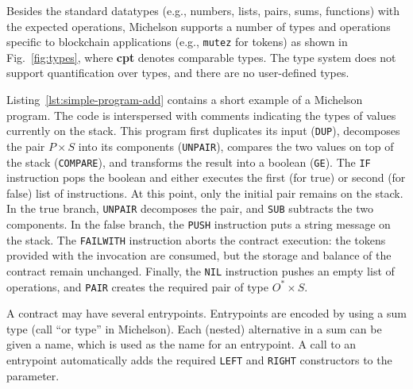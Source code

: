 \documentclass[runningheads]{llncs}
\begin{document}
Besides the standard datatypes (e.g., numbers, lists, pairs, sums, functions) with the expected operations, Michelson supports a number of types and operations specific to blockchain applications (e.g., \texttt{mutez} for tokens) as shown in Fig.~\ref{fig:types}, where \textbf{cpt} denotes comparable types. The type system does not support quantification over types, and there are no user-defined types.

Listing~\ref{lst:simple-program-add} contains a short example of a Michelson program. The code is interspersed with comments indicating the types of values currently on the stack. This program first duplicates its input (\lstinline|DUP|), decomposes the pair $P \times S$ into its components (\lstinline|UNPAIR|), compares the two values on top of the stack (\lstinline|COMPARE|), and transforms the result into a boolean (\lstinline|GE|). The \lstinline|IF| instruction pops the boolean and either executes the first (for true) or second (for false) list of instructions. At this point, only the initial pair remains on the stack. In the true branch, \lstinline|UNPAIR| decomposes the pair, and \lstinline|SUB| subtracts the two components. In the false branch, the \lstinline|PUSH| instruction puts a string message on the stack. The \lstinline|FAILWITH| instruction aborts the contract execution: the tokens provided with the invocation are consumed, but the storage and balance of the contract remain unchanged. Finally, the \lstinline|NIL| instruction pushes an empty list of operations, and \lstinline|PAIR| creates the required pair of type $O^* \times S$.

A contract may have several entrypoints. Entrypoints are encoded by
using a sum type (call ``or type'' in Michelson). Each (nested) alternative in a sum can be
given a name, which is used as the name for an entrypoint. A call to
an entrypoint automatically adds the required \lstinline|LEFT| and
\lstinline|RIGHT| constructors to the parameter.
\lstset{language=Caml}
\end{document}
